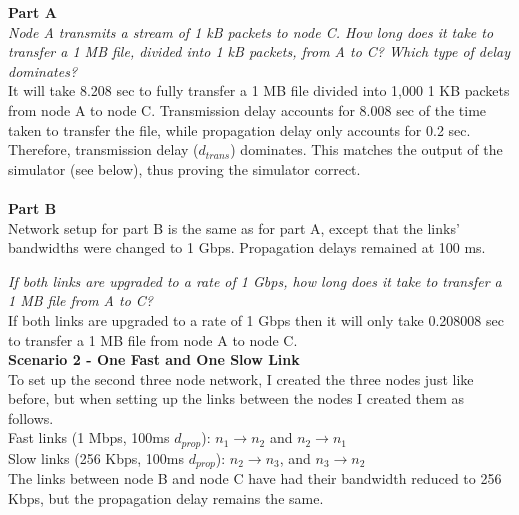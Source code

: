 \documentclass[11pt]{article}
\begin{document}


\noindent
\textbf{Part A}\\
\textit{Node A transmits a stream of 1 kB packets to node C. How long does it take to transfer a 1 MB file, divided into 1 kB packets, from A to C? Which type of delay dominates?}\\
\indent It will take 8.208 sec to fully transfer a 1 MB file divided into 1,000 1 KB packets from node A to node C. Transmission delay accounts for 8.008 sec of the time taken to transfer the file, while propagation delay only accounts for 0.2 sec. Therefore, transmission delay ($d_{trans}$) dominates. This matches the output of the simulator (see below), thus proving the simulator correct.\\
\\
\noindent
\textbf{Part B}\\
Network setup for part B is the same as for part A, except that the links' bandwidths were changed to 1 Gbps. Propagation delays remained at 100 ms.

\textit{If both links are upgraded to a rate of 1 Gbps, how long does it take to transfer a 1 MB file from A to C?}\\
\indent If both links are upgraded to a rate of 1 Gbps then it will only take 0.208008 sec to transfer a 1 MB file from node A to node C.\\

\vspace{0.25cm}
\noindent
\textbf{Scenario 2 - One Fast and One Slow Link}\\
\noindent
To set up the second three node network, I created the three nodes just like before, but when setting up the links between the nodes I created them as follows.\\
\indent Fast links (1 Mbps, 100ms $d_{prop}$): $n_{1}\to{n_{2}}$ and $n_{2}\to{n_{1}}$\\
\indent Slow links (256 Kbps, 100ms $d_{prop}$): $n_{2}\to{n_{3}}$, and $n_{3}\to{n_{2}}$\\
The links between node B and node C have had their bandwidth reduced to 256 Kbps, but the propagation delay remains the same.\\
\end{document}
